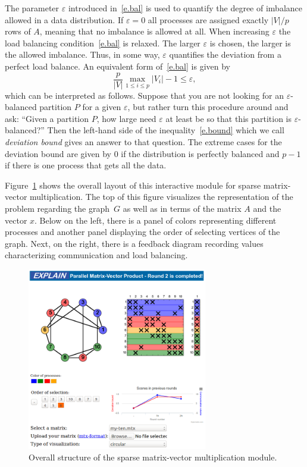 \documentclass[12pt, twoside,a4paper,toc=bibliography]{scrbook}
\begin{document}
The parameter $\varepsilon$ introduced in~\eqref{e.bal} is used to quantify the degree of
imbalance allowed in a data distribution. If $\varepsilon = 0$ all processes are assigned
exactly $|V|/p$ rows of $A$, meaning that no imbalance is allowed at all. When
increasing $\varepsilon$ the load balancing condition~\eqref{e.bal} is relaxed. The
larger $\varepsilon$ is chosen, the larger is the allowed imbalance. Thus, in some way,
$\varepsilon$ quantifies the deviation from a perfect load balance. An equivalent form
of~\eqref{e.bal} is given by
\begin{equation}\label{e.bound}
\frac{p}{|V|} \max_{1 \leq i \leq p} |V_i| - 1 \leq \varepsilon ,
\end{equation}
which can be interpreted as follows. Suppose that you are not looking for an
$\varepsilon$-balanced partition $P$ for a given $\varepsilon$, but rather turn this
procedure around and ask: ``Given a partition $P$, how large need $\varepsilon$ at least
be so that this partition is $\varepsilon$-balanced?'' Then the left-hand side of the
inequality~\eqref{e.bound} which we call \emph{deviation bound} gives an answer to that
question. The extreme cases for the deviation bound are given by $0$ if the distribution is
perfectly balanced and $p-1$ if there is one process that gets all the data. 

Figure~\ref{f.explain.matvec} shows the overall layout of this interactive
module for sparse matrix-vector multiplication.
The top of this figure visualizes 
the representation of the problem regarding the graph~$G$ as well as in terms
of the matrix $A$ and the vector $x$. Below on the left, there is a panel of
colors representing different processes and another panel displaying the order of
selecting vertices of the graph. Next, on the right, there is a feedback diagram recording
values characterizing communication and load balancing.

\begin{figure}
\centering
\includegraphics[width=0.7\textwidth]{final}
\caption{Overall structure of the sparse matrix-vector multiplication module.}
\label{f.explain.matvec}
\end{figure}
\end{document}
